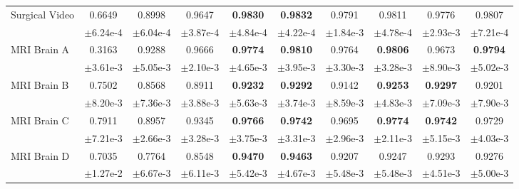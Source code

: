 \begin{table}[!htbp]
\begin{tabular}{l|*{9}{c|}}
      \midrule\midrule
      {\scriptsize Surgical Video} & \scriptsize 0.6649 & \scriptsize 0.8998 & \scriptsize 0.9647 & \textbf{\scriptsize 0.9830} & {\color{red} \textbf{\scriptsize 0.9832}} & \scriptsize 0.9791 & \scriptsize 0.9811 & \scriptsize 0.9776 & \scriptsize 0.9807 \\[-4pt]
       & \tiny $\pm$6.24e-4 & \tiny $\pm$6.04e-4 & \tiny $\pm$3.87e-4 & \tiny $\pm$4.84e-4 & \tiny $\pm$4.22e-4 & \tiny $\pm$1.84e-3 & \tiny $\pm$4.78e-4 & \tiny $\pm$2.93e-3 & \tiny $\pm$7.21e-4 \\\midrule\midrule
      {\scriptsize MRI Brain A} & \scriptsize 0.3163 & \scriptsize 0.9288 & \scriptsize 0.9666 & \textbf{\scriptsize 0.9774} & {\color{red} \textbf{\scriptsize 0.9810}} & \scriptsize 0.9764 & \textbf{\scriptsize 0.9806} & \scriptsize 0.9673 & \textbf{\scriptsize 0.9794} \\[-4pt]
       & \tiny $\pm$3.61e-3 & \tiny $\pm$5.05e-3 & \tiny $\pm$2.10e-3 & \tiny $\pm$4.65e-3 & \tiny $\pm$3.95e-3 & \tiny $\pm$3.30e-3 & \tiny $\pm$3.28e-3 & \tiny $\pm$8.90e-3 & \tiny $\pm$5.02e-3 \\\midrule
      {\scriptsize MRI Brain B} & \scriptsize 0.7502 & \scriptsize 0.8568 & \scriptsize 0.8911 & \textbf{\scriptsize 0.9232} & \textbf{\scriptsize 0.9292} & \scriptsize 0.9142 & \textbf{\scriptsize 0.9253} & {\color{red} \textbf{\scriptsize 0.9297}} & \scriptsize 0.9201 \\[-4pt]
       & \tiny $\pm$8.20e-3 & \tiny $\pm$7.36e-3 & \tiny $\pm$3.88e-3 & \tiny $\pm$5.63e-3 & \tiny $\pm$3.74e-3 & \tiny $\pm$8.59e-3 & \tiny $\pm$4.83e-3 & \tiny $\pm$7.09e-3 & \tiny $\pm$7.90e-3 \\\midrule
      {\scriptsize MRI Brain C} & \scriptsize 0.7911 & \scriptsize 0.8957 & \scriptsize 0.9345 & \textbf{\scriptsize 0.9766} & \textbf{\scriptsize 0.9742} & \scriptsize 0.9695 & {\color{red} \textbf{\scriptsize 0.9774}} & \textbf{\scriptsize 0.9742} & \scriptsize 0.9729 \\[-4pt]
       & \tiny $\pm$7.21e-3 & \tiny $\pm$2.66e-3 & \tiny $\pm$3.28e-3 & \tiny $\pm$3.75e-3 & \tiny $\pm$3.31e-3 & \tiny $\pm$2.96e-3 & \tiny $\pm$2.11e-3 & \tiny $\pm$5.15e-3 & \tiny $\pm$4.03e-3 \\\midrule
      {\scriptsize MRI Brain D} & \scriptsize 0.7035 & \scriptsize 0.7764 & \scriptsize 0.8548 & {\color{red} \textbf{\scriptsize 0.9470}} & \textbf{\scriptsize 0.9463} & \scriptsize 0.9207 & \scriptsize 0.9247 & \scriptsize 0.9293 & \scriptsize 0.9276 \\[-4pt]
       & \tiny $\pm$1.27e-2 & \tiny $\pm$6.67e-3 & \tiny $\pm$6.11e-3 & \tiny $\pm$5.42e-3 & \tiny $\pm$4.67e-3 & \tiny $\pm$5.48e-3 & \tiny $\pm$5.48e-3 & \tiny $\pm$4.51e-3 & \tiny $\pm$5.00e-3 \\\midrule

\end{tabular}
\end{table}
